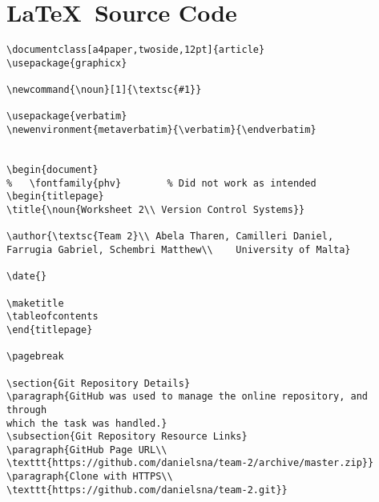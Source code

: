 \documentclass[a4paper,twoside,12pt]{article}
\newcommand{\noun}[1]{\textsc{#1}}
\begin{document}
\pagebreak[4]
\section{\LaTeX\ Source Code}

\begin{verbatim}
\documentclass[a4paper,twoside,12pt]{article}
\usepackage{graphicx}

\newcommand{\noun}[1]{\textsc{#1}}

\usepackage{verbatim}
\newenvironment{metaverbatim}{\verbatim}{\endverbatim}


\begin{document}
%	\fontfamily{phv}		% Did not work as intended
\begin{titlepage}	
\title{\noun{Worksheet 2\\ Version Control Systems}}

\author{\textsc{Team 2}\\ Abela Tharen, Camilleri Daniel, 
Farrugia Gabriel, Schembri Matthew\\	University of Malta}

\date{}

\maketitle
\tableofcontents
\end{titlepage}	

\pagebreak

\section{Git Repository Details}
\paragraph{GitHub was used to manage the online repository, and through 
which the task was handled.}
\subsection{Git Repository Resource Links}
\paragraph{GitHub Page URL\\ 
\texttt{https://github.com/danielsna/team-2/archive/master.zip}}
\paragraph{Clone with HTTPS\\ 
\texttt{https://github.com/danielsna/team-2.git}}

\end{verbatim}
\end{document}
